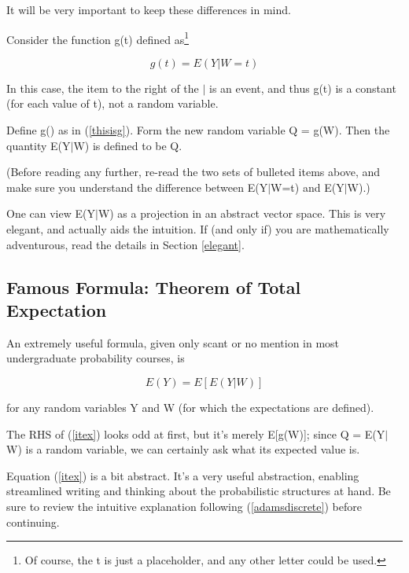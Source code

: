\documentclass[11pt]{article}
\begin{document}
It will be very important to keep these differences in mind.

Consider the function g(t) defined as\footnote{Of course, the t is just
a placeholder, and any other letter could be used.} 

\begin{equation}
\label{thisisg}
g(t)=E(Y|W=t)
\end{equation}

In this case, the item to the right of the $|$ is an event, and thus
g(t) is a constant (for each value of t), not a random variable.

\begin{definition}

Define g() as in (\ref{thisisg}).  Form the new random variable Q =
g(W).  Then the quantity E(Y$|$W) is defined to be Q. 

\end{definition}

(Before reading any further, re-read the two sets of bulleted items
above, and make sure you understand the difference between E(Y$|$W=t)
and E(Y$|$W).)

One can view E(Y$|$W) as a projection in an abstract vector space.  This
is very elegant, and actually aids the intuition.  If (and only if) you
are mathematically adventurous, read the details in Section
\ref{elegant}.

\subsection{Famous Formula: Theorem of Total Expectation}

An extremely useful formula, given only scant or no mention in
most undergraduate probability courses, is 

\begin{equation}
\label{itex}
E(Y)=E[E(Y|W)]
\end{equation}

for any random variables Y and W (for which the expectations are
defined).  

The RHS of (\ref{itex}) looks odd at first, but it's merely E[g(W)];
since Q =  E(Y$|$W) is a random variable, we can certainly ask what its
expected value is.

Equation (\ref{itex}) is a bit abstract.  It's a very useful
abstraction, enabling streamlined writing and thinking about the
probabilistic structures at hand.  Be sure to review the intuitive
explanation following (\ref{adamsdiscrete}) before continuing.
\end{document}
